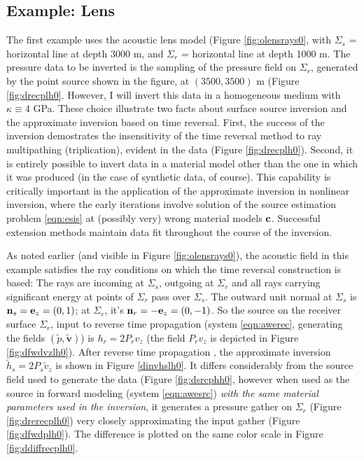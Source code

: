 \documentclass[georeport,12pt]{geophysics}
\newcommand{\bv}{\mathbf{v}}
\begin{document}
\subsection{Example: Lens}
The first example uses the acoustic lens model (Figure
\ref{fig:olensrays0}, with $\Sigma_s$ = horizontal line at depth 
3000 m, and $\Sigma_r$ = horizontal line at depth 1000 m. The pressure
data to be inverted is the sampling of the pressure field on
$\Sigma_r$, generated by the point source shown in the figure, at
$(3500, 3500)$ m (Figure \ref{fig:drecplh0}. However, I will invert
this data in a homogeneous medium with $\kappa \equiv 4$ GPa. These
choice illustrate two facts about surface source inversion and the
approximate inversion based on time reversal. First, the success of the inversion demostrates the
insensitivity of the time reversal method to ray multipathing
(triplication), evident in the data (Figure \ref{fig:drecplh0}).
Second, it is entirely possible to invert data in a material model
other than the one in which it was produced (in the case of synthetic
data, of course). This
capability is critically important in the application of the
approximate inversion in nonlinear inversion, where the early iterations
involve solution of the source estimation problem \ref{eqn:esis} at
(possibly very) wrong material models ${\bf c}$. Successful extension
methods maintain data fit throughout the course of the inversion.

As noted earlier (and visible in Figure \ref{fig:olensrays0}), the acoustic field in this example satisfies the ray
conditions on which the time reversal construction is based: The rays
are incoming at $\Sigma_s$, outgoing at $\Sigma_r$ and all rays
carrying significant energy at points of $\Sigma_r$ pass over
$\Sigma_s$. The outward unit normal at $\Sigma_s$ is ${\bf n}_s ={\bf
  e}_z=(0,1)$; at $\Sigma_r$, it's ${\bf n}_r =-{\bf
  e}_z=(0,-1)$. So the source on the receiver surface $\Sigma_r$, input to reverse time propagation
(system \ref{eqn:awerec}, generating the fields $(\tilde{p},\tilde{\bv})$) is
$h_r=2P_rv_z$ (the field $P_rv_z$ is depicted in Figure \ref{fig:dfwdvzlh0}). After reverse time propagation , the approximate
inversion $\tilde{h}_s=2P_s\tilde{v}_z$ is shown in Figure
\ref{dinvhslh0}. It differs considerably from the source field used to
generate the data (Figure \ref{fig:dsrcphh0}, however when used as the
source in forward modeling (system \ref{eqn:awesrc}) {\em with the
  same material parameters used in the inversion}, it generates a
pressure gather on $\Sigma_r$ (Figure \ref{fig:drerecplh0}) very
closely 
approximating the input gather (Figure \ref{fig:dfwdplh0}). The
difference is plotted on the same color scale in Figure
\ref{fig:ddiffrecplh0}.
\end{document}
